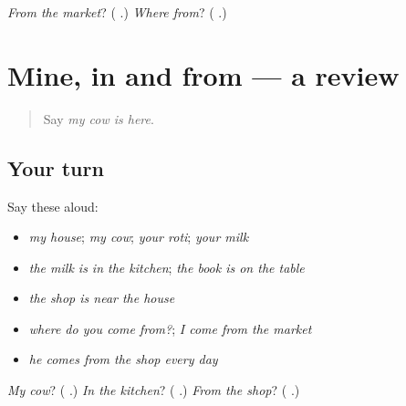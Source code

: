 \begin{tcolorbox}[breakable,colback=teal!4,colframe=teal!35!black,title={Before you move on}]
\emph{From the market}? (\textbf{ }.) \emph{Where from}? (\textbf{ }.)
\end{tcolorbox}
\section[(dialogue)]{Mine, in and from — a review}

\label{lesson:MW-R156-mine-in-from}



\begin{quote}
Say \emph{my cow is here}.
\end{quote}

\subsection*{Your turn}
Say these aloud:

\begin{itemize}
\raggedright
  \item \emph{my house}; \emph{my cow}; \emph{your roti}; \emph{your milk}
  \item \emph{the milk is in the kitchen}; \emph{the book is on the table}
  \item \emph{the shop is near the house}
  \item \emph{where do you come from?}; \emph{I come from the market}
  \item \emph{he comes from the shop every day}
\end{itemize}

\begin{tcolorbox}[breakable,colback=teal!4,colframe=teal!35!black,title={Before you move on}]
\emph{My cow}? (\textbf{ }.) \emph{In the kitchen}? (\textbf{ }.) \emph{From the shop}? (\textbf{ }.)
\end{tcolorbox}
